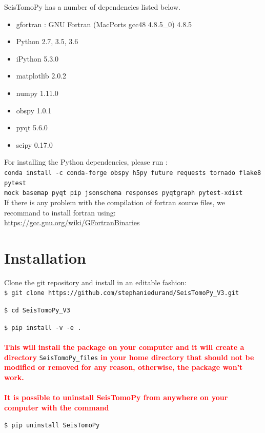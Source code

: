 \documentclass[12pt]{article}
\begin{document}
SeisTomoPy has a number of dependencies listed below.

\begin{itemize}
    \item gfortran : GNU Fortran (MacPorts gcc48 4.8.5\_0) 4.8.5
\item Python 2.7, 3.5, 3.6
\item iPython 5.3.0
\item matplotlib 2.0.2
\item  numpy 1.11.0
\item obspy 1.0.1
\item pyqt 5.6.0
\item scipy 0.17.0
\end{itemize}
For installing the Python dependencies, please run :\\
\verb?conda install -c conda-forge obspy h5py future requests tornado flake8 pytest  ?\\
\verb?mock basemap pyqt pip jsonschema responses pyqtgraph pytest-xdist?\\

\noindent If there is any problem with the compilation of fortran source files, we recommand to install fortran using:\\
\url{https://gcc.gnu.org/wiki/GFortranBinaries}

\section{Installation}

Clone the git repository and install in an editable fashion:\\

\verb?$ git clone https://github.com/stephaniedurand/SeisTomoPy_V3.git?

\verb?$ cd SeisTomoPy_V3?

\verb?$ pip install -v -e .?
\\
\\
\noindent   \textcolor{red}{\textbf{This will install the package on your computer and it will create a directory}} \verb?SeisTomoPy_files? \textcolor{red}{\textbf{in your home directory that should not be modified or removed for any reason, otherwise, the package won't work.}} \\
\\
  \textcolor{red}{\textbf{It is possible to uninstall SeisTomoPy from anywhere on your computer with the command}}

\verb?$ pip uninstall SeisTomoPy?
\end{document}
